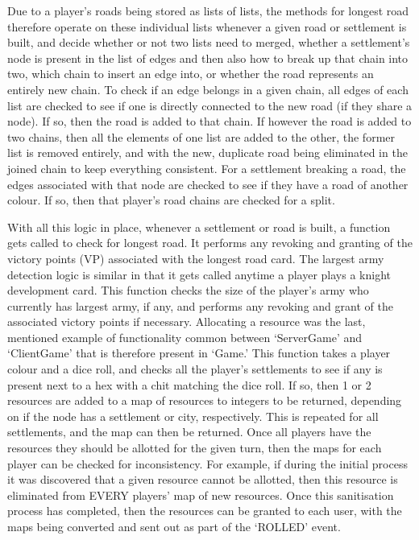 \documentclass[a4paper,doc,draftfirst]{apa6}
\begin{document}
Due to a player’s roads being stored as lists of lists, the methods for longest road therefore operate on these individual lists whenever a given road or settlement is built, and decide whether or not two lists need to merged, whether a settlement’s node is present in the list of edges and then also how to break up that chain into two, which chain to insert an edge into, or whether the road represents an entirely new chain. To check if an edge belongs in a given chain, all edges of each list are checked to see if one is directly connected to the new road (if they share a node). If so, then the road is added to that chain. If however the road is added to two chains, then all the elements of one list are added to the other, the former list is removed entirely, and with the new, duplicate road being eliminated in the joined chain to keep everything consistent.  For a settlement breaking a road, the edges associated with that node are checked to see if they have a road of another colour. If so, then that player’s road chains are checked for a split.

With all this logic in place, whenever a settlement or road is built, a function gets called to check for longest road. It performs any revoking and granting of the victory points (VP) associated with the longest road card. The largest army detection logic is similar in that it gets called anytime a player plays a knight development card. This function checks the size of the player’s army who currently has largest army, if any, and performs any revoking and grant of the associated victory points if necessary. Allocating a resource was the last, mentioned example of functionality common between ‘ServerGame’ and ‘ClientGame’ that is therefore present in ‘Game.’ This function takes a player colour and a dice roll, and checks all the player’s settlements to see if any is present next to a hex with a chit matching the dice roll. If so, then 1 or 2 resources are added to a map of resources to integers to be returned, depending on if the node has a settlement or city, respectively. This is repeated for all settlements, and the map can then be returned. Once all players have the resources they should be allotted for the given turn, then the maps for each player can be checked for inconsistency. For example, if during the initial process it was discovered that a given resource cannot be allotted, then this resource is eliminated from EVERY players’ map of new resources. Once this sanitisation process has completed, then the resources can be granted to each user, with the maps being converted and sent out as part of the ‘ROLLED’ event.
\end{document}
